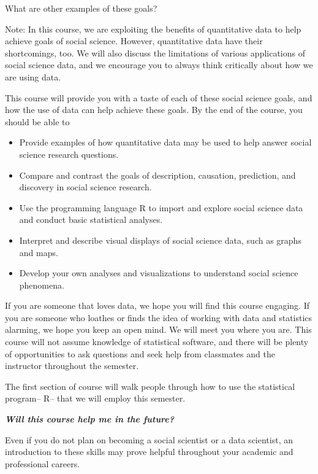 \documentclass[
  letterpaper,
  DIV=11,
  numbers=noendperiod]{scrreprt}
\providecommand{\tightlist}{%
  \setlength{\itemsep}{0pt}\setlength{\parskip}{0pt}}\usepackage{longtable,booktabs,array}
\begin{document}
What are other examples of these goals?

Note: In this course, we are exploiting the benefits of quantitative
data to help achieve goals of social science. However, quantitative data
have their shortcomings, too. We will also discuss the limitations of
various applications of social science data, and we encourage you to
always think critically about how we are using data.

This course will provide you with a taste of each of these social
science goals, and how the use of data can help achieve these goals. By
the end of the course, you should be able to

\begin{itemize}
\tightlist
\item
  Provide examples of how quantitative data may be used to help answer
  social science research questions.
\item
  Compare and contrast the goals of description, causation, prediction,
  and discovery in social science research.
\item
  Use the programming language R to import and explore social science
  data and conduct basic statistical analyses.
\item
  Interpret and describe visual displays of social science data, such as
  graphs and maps.
\item
  Develop your own analyses and visualizations to understand social
  science phenomena.
\end{itemize}

If you are someone that loves data, we hope you will find this course
engaging. If you are someone who loathes or finds the idea of working
with data and statistics alarming, we hope you keep an open mind. We
will meet you where you are. This course will not assume knowledge of
statistical software, and there will be plenty of opportunities to ask
questions and seek help from classmates and the instructor throughout
the semester.

The first section of course will walk people through how to use the
statistical program-- R-- that we will employ this semester.

\textbf{\emph{Will this course help me in the future?}}

Even if you do not plan on becoming a social scientist or a data
scientist, an introduction to these skills may prove helpful throughout
your academic and professional careers.
\end{document}
